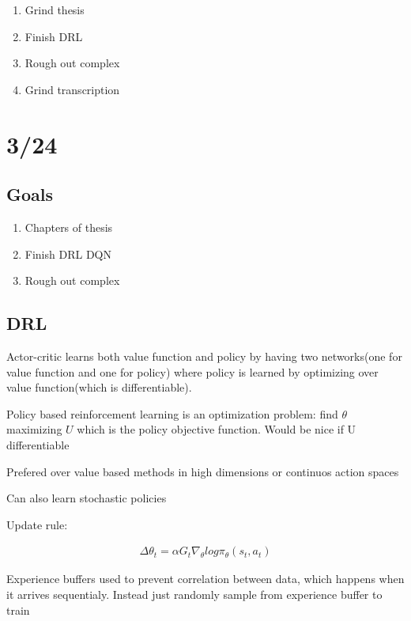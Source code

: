 \documentclass[11pt]{article}
\theoremstyle{remark}
\begin{document}
\begin{enumerate}
	\item Grind thesis
	\item Finish DRL
	\item Rough out complex
	\item Grind transcription
\end{enumerate}

\section{3/24}

\subsection{Goals}

\begin{enumerate}
	\item Chapters of thesis
	\item Finish DRL DQN
	\item Rough out complex
\end{enumerate}

\subsection{DRL}


	Actor-critic learns both value function and policy by having two networks(one for value function and one for policy) where policy is learned by optimizing over value function(which is differentiable).



	Policy based reinforcement learning is an optimization problem: find $\theta$ maximizing $U$ which is the policy objective function. Would be nice if U differentiable



	Prefered over value based methods in high dimensions or continuos action spaces

	Can also learn stochastic policies

Update rule:

\begin{align*}
	\Delta \theta_t = \alpha G_t \nabla_{\theta} log \pi_{\theta}(s_t,a_t)
\end{align*}

Experience buffers used to prevent correlation between data, which happens when it arrives sequentialy. Instead just randomly sample from experience buffer to train
\end{document}
